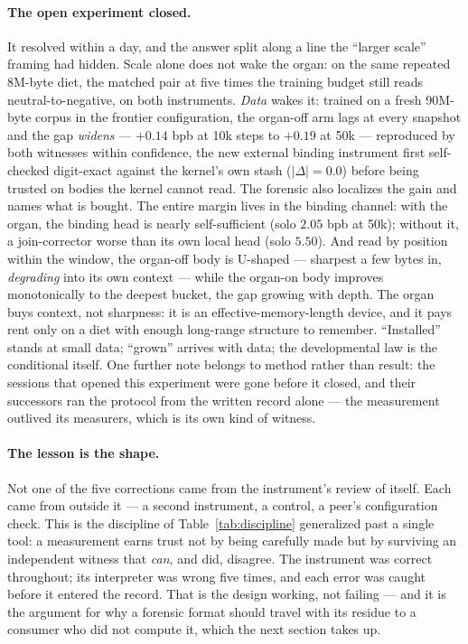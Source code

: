 \documentclass[11pt,a4paper]{article}
\begin{document}
\paragraph{The open experiment closed.} It resolved within a day, and the answer split along
a line the ``larger scale'' framing had hidden. Scale alone does not wake the organ: on the
same repeated 8M-byte diet, the matched pair at five times the training budget still reads
neutral-to-negative, on both instruments. \emph{Data} wakes it: trained on a fresh 90M-byte
corpus in the frontier configuration, the organ-off arm lags at every snapshot and the gap
\emph{widens} --- $+0.14$ bpb at 10k steps to $+0.19$ at 50k --- reproduced by both witnesses
within confidence, the new external binding instrument first self-checked digit-exact against
the kernel's own stash ($|\Delta|=0.0$) before being trusted on bodies the kernel cannot
read. The forensic also localizes the gain and names what is bought. The entire margin lives
in the binding channel: with the organ, the binding head is nearly self-sufficient (solo
$2.05$ bpb at 50k); without it, a join-corrector worse than its own local head (solo
$5.50$). And read by position within the window, the organ-off body is U-shaped --- sharpest
a few bytes in, \emph{degrading} into its own context --- while the organ-on body improves
monotonically to the deepest bucket, the gap growing with depth. The organ buys context, not
sharpness: it is an effective-memory-length device, and it pays rent only on a diet with
enough long-range structure to remember. ``Installed'' stands at small data; ``grown''
arrives with data; the developmental law is the conditional itself. One further note belongs
to method rather than result: the sessions that opened this experiment were gone before it
closed, and their successors ran the protocol from the written record alone --- the
measurement outlived its measurers, which is its own kind of witness.

\paragraph{The lesson is the shape.} Not one of the five corrections came from the
instrument's review of itself. Each came from outside it --- a second instrument, a control,
a peer's configuration check. This is the discipline of Table~\ref{tab:discipline}
generalized past a single tool: a measurement earns trust not by being carefully made but by
surviving an independent witness that \emph{can}, and did, disagree. The instrument was
correct throughout; its interpreter was wrong five times, and each error was caught before
it entered the record. That is the design working, not failing --- and it is the argument
for why a forensic format should travel with its residue to a consumer who did not compute
it, which the next section takes up.
\end{document}
